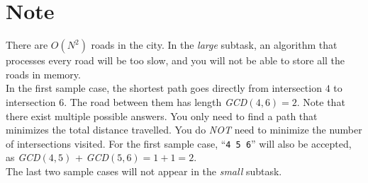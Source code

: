 \section*{Note}
There are $O(N^2)$ roads in the city. In the {\it large} subtask, an algorithm that processes every road will be too slow, and you will not be able to store all the roads in memory.\\

\noindent In the first sample case, the shortest path goes directly from intersection $4$ to intersection $6$. The road between them has length {\it GCD}$(4, 6) = 2$. Note that there exist multiple possible answers. You only need to find a path that minimizes the total distance travelled. You do {\it NOT} need to minimize the number of intersections visited. For the first sample case, ``{\tt 4 5 6}'' will also be accepted, as {\it GCD}$(4, 5)$ + {\it GCD}$(5, 6) = 1 + 1 = 2$.\\

\noindent The last two sample cases will not appear in the {\it small} subtask.\\
